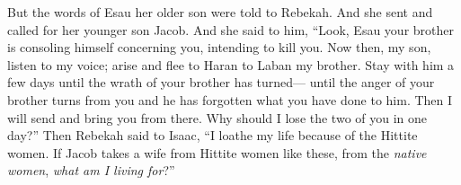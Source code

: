 \begin{biblechapter}
\verse But the words of Esau her older son were told to Rebekah. And she sent and called for her younger son Jacob. And she said to him, “Look, Esau your brother is consoling himself concerning you, intending to kill you.
\verse Now then, my son, listen to my voice; arise and flee to Haran to Laban my brother.
\verse Stay with him a few days until the wrath of your brother has turned—
\verse until the anger of your brother turns from you and he has forgotten what you have done to him. Then I will send and bring you from there. Why should I lose the two of you in one day?”
\verse Then Rebekah said to Isaac, “I loathe my life because of the Hittite women. If Jacob takes a wife from Hittite women like these, from the \textit{native women}, \textit{what am I living for}?”
\end{biblechapter}

